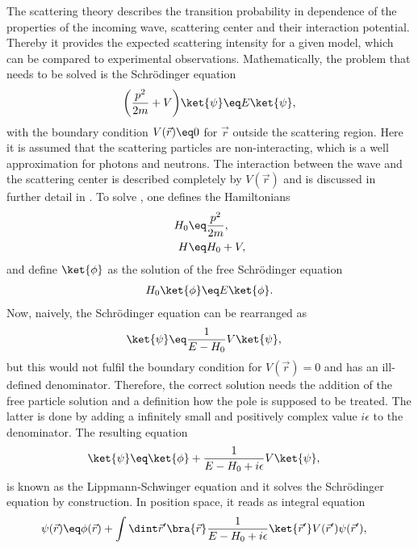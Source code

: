 \documentclass[\main/dresen_thesis.tex]{subfiles}
\begin{document}
The scattering theory describes the transition probability in dependence of the properties of the incoming wave, scattering center and their interaction potential. 
Thereby it provides the expected scattering intensity for a given model, which can be compared to experimental observations. 
Mathematically, the problem that needs to be solved is the Schr\"odinger equation
\begin{align}
  \label{eq:theoreticalBackground:scattering:scatteringTheory:schrodingerEquation}
  \bigg(\frac{p^2}{2m} + V \bigg) \ket{\psi} \eq E \ket{\psi},
\end{align}
with the boundary condition $V(\vec{r}) \eq 0$ for $\vec{r}$ outside the scattering region. Here it is assumed that the scattering particles are non-interacting, which is a well approximation for photons and neutrons. 
The interaction between the wave and the scattering center is described completely by $V(\vec{r})$ and is discussed in further detail in . 
To solve , one defines the Hamiltonians
\begin{align}
  H_0 &\eq \frac{p^2}{2m},\\
  H &\eq H_0 + V,
\end{align}
and define $\ket{\phi}$ as the solution of the free Schr\"odinger equation
\begin{align}
  H_0 \ket{\phi} &\eq E \ket{\phi}.\\
\end{align}
Now, naively, the Schr\"odinger equation can be rearranged as
\begin{align}
  \ket{\psi} &\eq \frac{1}{E - H_0} V \ket{\psi},
\end{align}
but this would not fulfil the boundary condition for $V(\vec{r}) = 0$ and has an ill-defined denominator. 
Therefore, the correct solution needs the addition of the free particle solution and a definition how the pole is supposed to be treated. 
The latter is done by adding a infinitely small and positively complex value $i\epsilon$ to the denominator. The resulting equation
\begin{align}
  \ket{\psi} &\eq \ket{\phi} +  \frac{1}{E - H_0 + i \epsilon} V \ket{\psi},
\end{align}
is known as the Lippmann-Schwinger equation and it solves the Schr\"odinger equation by construction. 
In position space, it reads as integral equation
\begin{align}
  \psi (\vec{r}) &\eq \phi(\vec{r}) + \int \dint \vec{r}^\prime \bra{\vec{r}}\frac{1}{E - H_0 + i \epsilon} \ket{\vec{r}^\prime} V (\vec{r}^\prime)\psi (\vec{r}^\prime),
\end{align}
\end{document}
